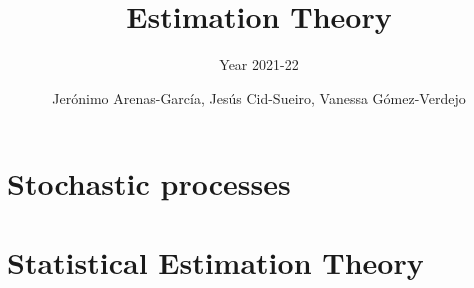 \documentclass[graybox,envcountchap,sectrefs]{svmono_mod}
\begin{document}
\author{Jer\'onimo Arenas-Garc\'ia, Jes\'us Cid-Sueiro, Vanessa G\'omez-Verdejo}
\title{Estimation Theory}
\subtitle{Year 2021-22}

\frontmatter

\chapter{Stochastic processes}

\chapter{Statistical Estimation Theory}
\mainmatter %
\tableofcontents








\backmatter
\printindex
\end{document}
